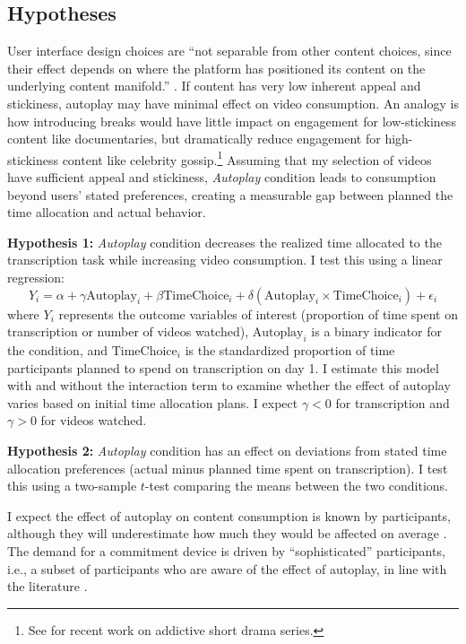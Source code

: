 \documentclass[11pt,a4paper,oneside]{article}
\begin{document}
\subsection{Hypotheses}\label{hypotheses}
User interface design choices are ``not separable from other content choices, since their effect depends on where the platform has positioned its content on the underlying content manifold.'' \citep{kleinberg2022challenge}. If content has very low inherent appeal and stickiness, autoplay may have minimal effect on video consumption. An analogy is how introducing breaks would have little impact on engagement for low-stickiness content like documentaries, but dramatically reduce engagement for high-stickiness content like celebrity gossip.\footnote{See \citet{bao2025just} for recent work on addictive short drama series.} Assuming that my selection of videos have sufficient appeal and stickiness, \textit{Autoplay} condition leads to consumption beyond users' stated preferences, creating a measurable gap between planned the time allocation and actual behavior.

\textbf{Hypothesis 1:} \textit{Autoplay} condition decreases the realized time allocated to the transcription task while increasing video consumption. I test this using a linear regression:
\begin{equation}\label{eq1}
Y_{i} = \alpha + \gamma \text{Autoplay}_{i} + \beta \text{TimeChoice}_{i} + \delta (\text{Autoplay}_{i} \times \text{TimeChoice}_{i}) + \epsilon_{i}
\end{equation}
where $Y_{i}$ represents the outcome variables of interest (proportion of time spent on transcription or number of videos watched), $\text{Autoplay}_{i}$ is a binary indicator for the condition, and $\text{TimeChoice}_{i}$ is the standardized proportion of time participants planned to spend on transcription on day 1. I estimate this model with and without the interaction term to examine whether the effect of autoplay varies based on initial time allocation plans. I expect $\gamma < 0$ for transcription and $\gamma > 0$ for videos watched.

\textbf{Hypothesis 2:} \textit{Autoplay} condition has an effect on deviations from stated time allocation preferences (actual minus planned time spent on transcription). I test this using a two-sample $t$-test comparing the means between the two conditions.

I expect the effect of autoplay on content consumption is known by participants, although they will underestimate how much they would be affected on average \citep{bongard2021definitely}. The demand for a commitment device is driven by ``sophisticated'' participants, i.e., a subset of participants who are aware of the effect of autoplay, in line with the literature \citep{ericsonIntertemporalChoice2019}. 
\end{document}
